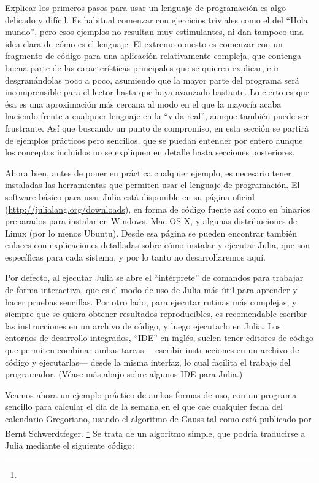 ﻿\documentclass[spanish]{article}
\begin{document}
Explicar los primeros pasos para usar un lenguaje de programación es algo delicado y difícil. Es habitual comenzar con ejercicios triviales como el del ``Hola mundo'', pero esos ejemplos no resultan muy estimulantes, ni dan tampoco una idea clara de cómo es el lenguaje. El extremo opuesto es comenzar con un fragmento de código para una aplicación relativamente compleja, que contenga buena parte de las características principales que se quieren explicar, e ir desgranándolas poco a poco, asumiendo que la mayor parte del programa será incomprensible para el lector hasta que haya avanzado bastante. Lo cierto es que ésa es una aproximación más cercana al modo en el que la mayoría acaba haciendo frente a cualquier lenguaje en la ``vida real'', aunque también puede ser frustrante. Así que buscando un punto de compromiso, en esta sección se partirá de ejemplos prácticos pero sencillos, que se puedan entender por entero aunque los conceptos incluidos no se expliquen en detalle hasta secciones posteriores.

Ahora bien, antes de poner en práctica cualquier ejemplo, es necesario tener instaladas las herramientas que permiten usar el lenguaje de programación. El software básico para usar Julia está disponible en su página oficial (\url{http://julialang.org/downloads}), en forma de código fuente así como en binarios preparados para instalar en Windows, Mac OS X, y algunas distribuciones de Linux (por lo menos Ubuntu). Desde esa página se pueden encontrar también enlaces con explicaciones detalladas sobre cómo instalar y ejecutar Julia, que son específicas para cada sistema, y por lo tanto no desarrollaremos aquí.

Por defecto, al ejecutar Julia se abre el ``intérprete'' de comandos para trabajar de forma interactiva, que es el modo de uso de Julia más útil para aprender y hacer pruebas sencillas. Por otro lado, para ejecutar rutinas más complejas, y siempre que se quiera obtener resultados reproducibles, es recomendable escribir las instrucciones en un archivo de código, y luego ejecutarlo en Julia. Los entornos de desarrollo integrados, ``IDE'' en inglés, suelen tener editores de código que permiten combinar ambas tareas ---escribir instrucciones en un archivo de código y ejecutarlas--- desde la misma interfaz, lo cual facilita el trabajo del programador. (Véase más abajo sobre algunos IDE para Julia.)

Veamos ahora un ejemplo práctico de ambas formas de uso, con un programa sencillo para calcular el día de la semana en el que cae cualquier fecha del calendario Gregoriano, usando el algoritmo de Gauss tal como está publicado por Bernt Schwerdtfeger.%
\footnote{%
%
} Se trata de un algoritmo simple, que podría traducirse a Julia mediante el siguiente código: 
\end{document}

